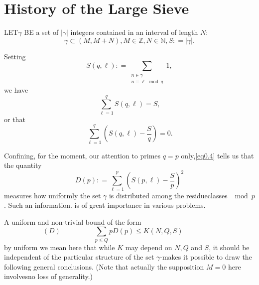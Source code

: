 


\setcounter{chapter}{-1}
\chapter{History of the Large Sieve}\label{chap0}%

LET\pageoriginale $\gamma$ BE a set of $| \gamma |$ integers contained in an
interval of length $N$: 
\begin{equation*}
\gamma \subset (M, M+N), M \in \mathbb{Z}, N \in \mathbb{N},S : = |\gamma |. 
\tag{0.1}\label{eq0.1}
\end{equation*}

Setting
\begin{equation*}
S(q,\ell): = \sum_{\substack{n \in \gamma \\ n \equiv \ell \mod q}} 1,
\tag{0.2}\label{eq0.2}
\end{equation*}
we have
\begin{equation*}
\sum_{\ell =1}^{q} S(q,\ell)= S,
\tag{0.3}\label{eq0.3}
\end{equation*}
or that
\begin{equation*}
\sum_{\ell =1}^{q} (S(q, \ell )- \frac{S}{q})=0.
\tag{0.4}\label{eq0.4}
\end{equation*}

Confining, for the moment, our attention to primes $q=p$ only,\break \eqref{eq0.4}
tells us that the quantity 
\begin{equation*}
D(p): = \sum_{\ell =1}^{p} (S(p, \ell )- \frac{S}{p})^2
\tag{0.5}\label{eq0.5}
\end{equation*}
measures how uniformly the set $\gamma$ is distributed among the
residue\break classes $\mod p$. Such an information. is of great importance
in various problems. 

A uniform and non-trivial bound of the form
\begin{equation*}
(D) \hspace{2cm}
\sum_{p \leq Q} p D(p) \leq K (N,Q,S) \hspace{2cm}
\tag{0.6}\label{eq0.6}
\end{equation*}
by uniform we mean here that while $K$ may depend on $N,Q$ and $S$, it
should be independent of the particular structure of the set
$\gamma$-makes it possible to draw the following general
conclusions. (Note that actually the supposition $M=0$ here
involves\pageoriginale no loss of generality.) 

